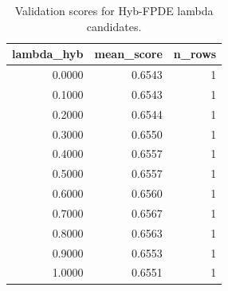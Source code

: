 \begin{table}[t]
\caption{Validation scores for Hyb-FPDE lambda candidates.}
\label{tab:lambda_distribution_computed}
\centering
\begin{tabular}{rrr}
\toprule
lambda\_hyb & mean\_score & n\_rows \\
\midrule
0.0000 & 0.6543 & 1 \\
0.1000 & 0.6543 & 1 \\
0.2000 & 0.6544 & 1 \\
0.3000 & 0.6550 & 1 \\
0.4000 & 0.6557 & 1 \\
0.5000 & 0.6557 & 1 \\
0.6000 & 0.6560 & 1 \\
0.7000 & 0.6567 & 1 \\
0.8000 & 0.6563 & 1 \\
0.9000 & 0.6553 & 1 \\
1.0000 & 0.6551 & 1 \\
\bottomrule
\end{tabular}

\end{table}
